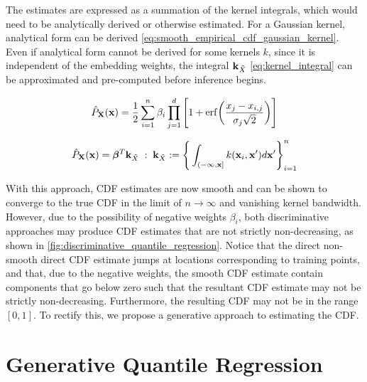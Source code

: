 \documentclass[twoside]{article} \usepackage{aistats2017}
\theoremstyle{definition}
\newcommand{\rv}[1]{{#1}}
\newcommand{\ds}[1]{\tilde{#1}}
\newcommand{\warn}[1]{{\color{red} #1}}
\begin{document}
		The estimates are expressed as a summation of the kernel integrals, which would need to be analytically derived or otherwise estimated. For a Gaussian kernel, analytical form can be derived \eqref{eq:smooth_empirical_cdf_gaussian_kernel}. Even if analytical form cannot be derived for some kernels $k$, since it is independent of the embedding weights, the integral $\bvec{k}_{\ds{X}}$ \eqref{eq:kernel_integral} can be approximated and pre-computed before inference begins.

		\begin{equation}
			\hat{P}_{\bvec{\rv{X}}}(\bvec{x}) = \frac{1}{2} \sum_{i = 1}^{n} \beta_{i} \prod_{j = 1}^{d} \Bigg[1 + \mathrm{erf}\bigg(\frac{x_{j} - x_{i, j}}{\sigma_{j} \sqrt{2}}\bigg)\Bigg]
		\label{eq:smooth_empirical_cdf_gaussian_kernel}
		\end{equation}

		\begin{equation}
			\hat{P}_{\bvec{\rv{X}}}(\bvec{x}) = \bm{\beta}^{T} \bvec{k}_{\ds{X}} \; : \; \bvec{k}_{\ds{X}} := \Bigg\{ \int_{(-\bvec{\infty}, \bvec{x}]}  k(\bvec{x}_{i}, \bvec{x}') d\bvec{x}' \Bigg\}_{i = 1}^{n}
		\label{eq:kernel_integral}
		\end{equation}
			
		With this approach, CDF estimates are now smooth and can be shown to converge to the true CDF in the limit of $n \rightarrow \infty$ and vanishing kernel bandwidth. However, due to the possibility of negative weights $\beta_{i}$, both discriminative approaches may produce CDF estimates that are not strictly non-decreasing, as shown in \cref{fig:discriminative_quantile_regression}. Notice that the direct non-smooth direct CDF estimate jumps at locations corresponding to training points, and that, due to the negative weights, the smooth CDF estimate contain components that go below zero such that the resultant CDF estimate may not be strictly non-decreasing. Furthermore, the resulting CDF may not be in the range $[0, 1]$. To rectify this, we propose a generative approach to estimating the CDF.

\section{Generative Quantile Regression}
\label{sec:generative_quantile_regression}

	
\end{document}
